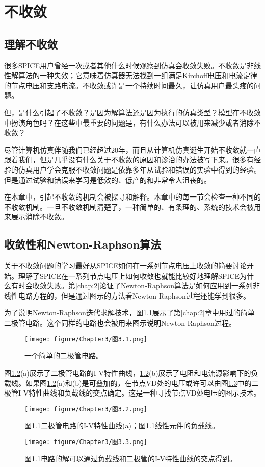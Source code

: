 \chapter{不收敛}
\label{chap:non-conver}

\section{理解不收敛}
很多SPICE用户曾经一次或者其他什么时候观察到仿真会收敛失败。不收敛是非线性解算法的一种失效；它意味着仿真器无法找到一组满足Kirchoff电压和电流定律的节点电压和支路电流。不收敛或许是一个持续时间最久，让仿真用户最头疼的问题。

但，是什么引起了不收敛？是因为解算法还是因为执行的仿真类型？模型在不收敛中扮演角色吗？在这些中最重要的问题是，有什么办法可以被用来减少或者消除不收敛？

尽管计算机仿真伴随我们已经超过20年，而且从计算机仿真诞生开始不收敛就一直跟着我们，但是几乎没有什么关于不收敛的原因和诊治的办法被写下来。很多有经验的仿真用户学会克服不收敛问题是依靠多年从试验和错误的实验中得到的经验。但是通过试验和错误来学习是低效的、低产的和非常令人沮丧的。

在本章中，引起不收敛的机制会被探寻和解释。本章中的每一节会检查一种不同的不收敛机制。一旦不收敛机制清楚了，一种简单的、有条理的、系统的技术会被用来展示消除不收敛。

\section{收敛性和Newton-Raphson算法}
关于不收敛问题的学习最好从SPICE如何在一系列节点电压上收敛的简要讨论开始。理解了SPICE在一系列节点电压上如何收敛也就能比较好地理解SPICE为什么有时会收敛失败。第\ref{chap:2}论证了Newton-Raphson算法是如何应用到一系列非线性电路方程的，但是通过图示的方法看Newton-Raphson过程还能学到很多。

为了说明Newton-Raphson迭代求解技术，图\ref{图3.1}展示了第\ref{chap:2}章中用过的简单二极管电路。这个同样的电路也会被用来图示说明Newton-Raphson过程。
\begin{figure}[htbp]
\small
    \centering
    \texttt{[image: figure/Chapter3/图3.1.png]}
    \caption{一个简单的二极管电路。}
    \label{图3.1}
\end{figure}

图\ref{图3.2}(a)展示了二极管电路的I-V特性曲线，\ref{图3.2}(b)展示了电阻和电流源影响下的负载线。如果图\ref{图3.2}(a)和(b)是可叠加的，在节点VD处的电压或许可以由图\ref{图3.3}中的二极管I-V特性曲线和负载线的交点确定。这是一种寻找节点VD处电压的图示技术。
\begin{figure}[htbp]
\small
    \centering
    \texttt{[image: figure/Chapter3/图3.2.png]}
    \caption{图\ref{图3.1}二极管电路的I-V特性曲线(a)；图\ref{图3.1}线性元件的负载线。}
    \label{图3.2}
\end{figure}
\begin{figure}[htbp]
\small
    \centering
    \texttt{[image: figure/Chapter3/图3.3.png]}
    \caption{图\ref{图3.1}电路的解可以通过负载线和二极管的I-V特性曲线的交点得到。}
    \label{图3.3}
\end{figure}

